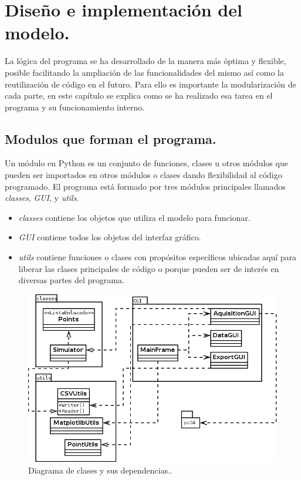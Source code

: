 \chapter{Diseño e implementación del modelo.}




	La lógica del programa se ha desarrollado de la manera más óptima y flexible, posible facilitando la ampliación de las funcionalidades del mismo así como la  reutilización de código en el futuro. Para ello es importante la modularización de cada parte, en este capítulo se explica como se ha realizado esa tarea en el programa y su funcionamiento interno.

	\section{Modulos que forman el programa.}
		Un módulo en Python es un conjunto de funciones, clases u otros módulos que pueden ser importados en otros módulos o clases dando flexibilidad al código programado. El programa está formado por tres módulos principales llamados \emph{classes}, \emph{GUI}, y \emph{utils}.
	\begin{itemize}
		\item \emph{classes} contiene los objetos que utiliza el modelo para funcionar.
		\item \emph{GUI} contiene todos los objetos del interfaz gráfico.
		
		\item \emph{utils} contiene funciones o clases con propósitos específicos ubicadas aquí para liberar las clases principales de código o porque pueden ser de interés en diversas partes del programa.
	\end{itemize}

		\begin{figure}[H]
		  \centering
		  \includegraphics[width=1\textwidth]{img/classes.png}
		  \caption{Diagrama de clases y sus dependencias..}\label{fig:diag-classes}
		\end{figure}

